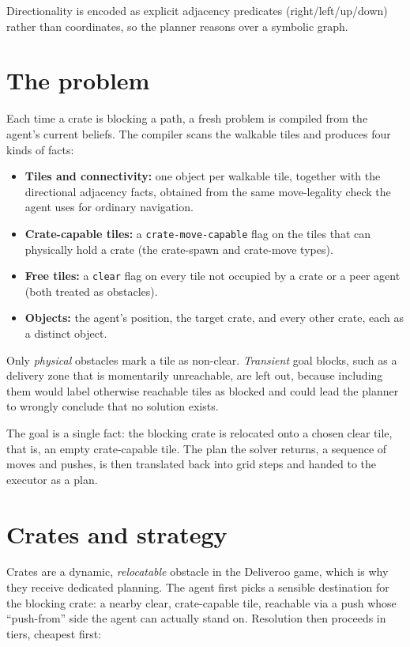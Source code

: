 Directionality is encoded as explicit adjacency predicates
(right/left/up/down) rather than coordinates, so the planner reasons over
a symbolic graph.

\section{The problem}
\label{sec:problem}
Each time a crate is blocking a path, a fresh problem is compiled from the agent's
current beliefs. The compiler scans the walkable tiles and produces four kinds of
facts:

\begin{itemize}
  \item \textbf{Tiles and connectivity:} one object per walkable tile, together with
        the directional adjacency facts, obtained from the same move-legality check
        the agent uses for ordinary navigation.
  \item \textbf{Crate-capable tiles:} a \texttt{crate-move-capable} flag on the tiles
        that can physically hold a crate (the crate-spawn and crate-move types).
  \item \textbf{Free tiles:} a \texttt{clear} flag on every tile not occupied by a
        crate or a peer agent (both treated as obstacles).
  \item \textbf{Objects:} the agent's position, the target crate, and every other
        crate, each as a distinct object.
\end{itemize}

Only \emph{physical} obstacles mark a tile as non-clear. \emph{Transient} goal blocks, 
such as a delivery zone that is momentarily unreachable, are left out, because 
including them would label otherwise reachable tiles as blocked and could lead the 
planner to wrongly conclude that no solution exists.

The goal is a single fact: the blocking crate is relocated onto a chosen clear
tile, that is, an empty crate-capable tile. The plan the
solver returns, a sequence of moves and pushes, is then translated back into grid
steps and handed to the executor as a plan.

\section{Crates and strategy}
\label{sec:tiered-strategy}
Crates are a dynamic, \emph{relocatable} obstacle in the Deliveroo game, which is why
they receive dedicated planning. The agent first picks a sensible destination for
the blocking crate: a nearby clear, crate-capable tile, reachable via a push whose
``push-from'' side the agent can actually stand on. Resolution then proceeds in tiers, cheapest first:

